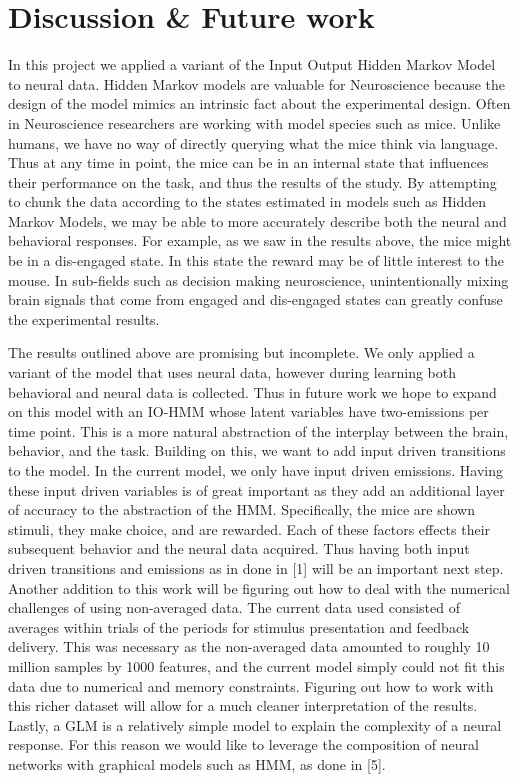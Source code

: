 \documentclass{article}
\begin{document}
\section{Discussion \& Future work}
In this project we applied a variant of the Input Output Hidden Markov Model to neural data. Hidden Markov models are valuable for Neuroscience because the design of the model mimics an intrinsic fact about the experimental design. Often in Neuroscience researchers are working with model species such as mice. Unlike humans, we have no way of directly querying what the mice think via language. Thus at any time in point, the mice can be in an internal state that influences their performance on the task, and thus the results of the study. By attempting to chunk the data according to the states estimated in models such as Hidden Markov Models, we may be able to more accurately describe both the neural and behavioral responses. For example, as we saw in the results above, the mice might be in a dis-engaged state. In this state the reward may be of little interest to the mouse. In sub-fields such as decision making neuroscience, unintentionally mixing brain signals that come from engaged and dis-engaged states can greatly confuse the experimental results. 

The results outlined above are promising but incomplete. We only applied a variant of the model that uses neural data, however during learning both behavioral and neural data is collected. Thus in future work we hope to expand on this model with an IO-HMM whose latent variables have two-emissions per time point. This is a more natural abstraction of the interplay between the brain, behavior, and the task. Building on this, we want to add input driven transitions to the model. In the current model, we only have input driven emissions. Having these input driven variables is of great important as they add an additional layer of accuracy to the abstraction of the HMM. Specifically, the mice are shown stimuli, they make choice, and are rewarded. Each of these factors effects their subsequent behavior and the neural data acquired. Thus having both input driven transitions and emissions as in done in [1] will be an important next step. Another addition to this work will be figuring out how to deal with the numerical challenges of using non-averaged data. The current data used consisted of averages within trials of the periods for stimulus presentation and feedback delivery. This was necessary as the non-averaged data amounted to roughly 10 million samples by 1000 features, and the current model simply could not fit this data due to numerical and memory constraints. Figuring out how to work with this richer dataset will allow for a much cleaner interpretation of the results. Lastly, a GLM is a relatively simple model to explain the complexity of a neural response. For this reason we would like to leverage the composition of neural networks with graphical models such as HMM, as done in [5]. 
\end{document}
